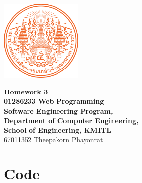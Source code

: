 \documentclass[12pt]{report} %
\begin{document}
\begin{titlepage}
	\centering
	\vspace*{1cm} %
	\includegraphics[width=0.3\textwidth]{../../images/KMITL Logo.png} %

	\vspace{1cm} %
	{\LARGE \textbf{Homework 3}} \\[0.5cm] %
	\vspace{0.5cm}
	{\large \textbf{01286233 Web Programming}} \\[0.5cm]
	{\large \textbf{Software Engineering Program,}} \\[0.5cm]
	{\large \textbf{Department of Computer Engineering,}} \\[0.5cm]
	{\large \textbf{School of Engineering, KMITL}} \\[1cm]
	{\Large 67011352 Theepakorn Phayonrat} \\[0.5cm] %
\end{titlepage}

\section*{Code}
\end{document}
